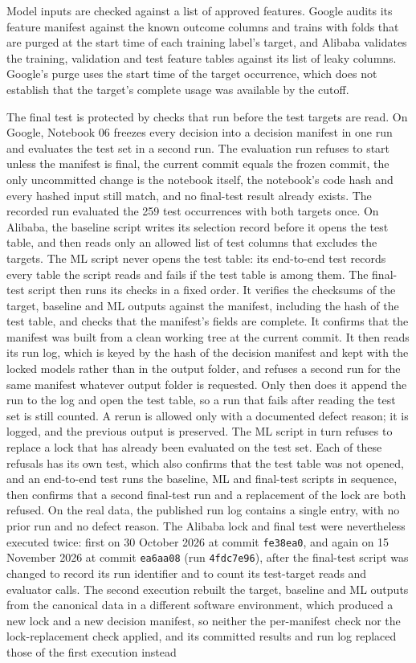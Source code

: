 \documentclass{IEEEtran}
\begin{document}
Model inputs are checked against a list of approved features. Google audits its feature manifest against the known outcome columns and trains with folds that are purged at the start time of each training label's target, and Alibaba validates the training, validation and test feature tables against its list of leaky columns. Google's purge uses the start time of the target occurrence, which does not establish that the target's complete usage was available by the cutoff.

The final test is protected by checks that run before the test targets are read. On Google, Notebook 06 freezes every decision into a decision manifest in one run and evaluates the test set in a second run. The evaluation run refuses to start unless the manifest is final, the current commit equals the frozen commit, the only uncommitted change is the notebook itself, the notebook's code hash and every hashed input still match, and no final-test result already exists. The recorded run evaluated the 259 test occurrences with both targets once. On Alibaba, the baseline script writes its selection record before it opens the test table, and then reads only an allowed list of test columns that excludes the targets. The ML script never opens the test table: its end-to-end test records every table the script reads and fails if the test table is among them. The final-test script then runs its checks in a fixed order. It verifies the checksums of the target, baseline and ML outputs against the manifest, including the hash of the test table, and checks that the manifest's fields are complete. It confirms that the manifest was built from a clean working tree at the current commit. It then reads its run log, which is keyed by the hash of the decision manifest and kept with the locked models rather than in the output folder, and refuses a second run for the same manifest whatever output folder is requested. Only then does it append the run to the log and open the test table, so a run that fails after reading the test set is still counted. A rerun is allowed only with a documented defect reason; it is logged, and the previous output is preserved. The ML script in turn refuses to replace a lock that has already been evaluated on the test set. Each of these refusals has its own test, which also confirms that the test table was not opened, and an end-to-end test runs the baseline, ML and final-test scripts in sequence, then confirms that a second final-test run and a replacement of the lock are both refused. On the real data, the published run log contains a single entry, with no prior run and no defect reason. The Alibaba lock and final test were nevertheless executed twice: first on 30 October 2026 at commit \texttt{fe38ea0}, and again on 15 November 2026 at commit \texttt{ea6aa08} (run \texttt{4fdc7e96}), after the final-test script was changed to record its run identifier and to count its test-target reads and evaluator calls. The second execution rebuilt the target, baseline and ML outputs from the canonical data in a different software environment, which produced a new lock and a new decision manifest, so neither the per-manifest check nor the lock-replacement check applied, and its committed results and run log replaced those of the first execution instead 
\end{document}
